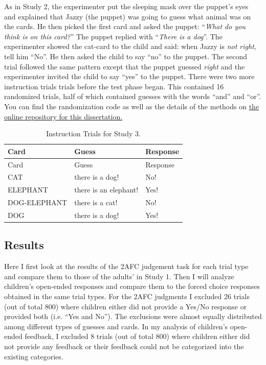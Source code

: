 \documentclass[oneside]{report}
\theoremstyle{definition}
\theoremstyle{definition}
\theoremstyle{definition}
\theoremstyle{remark}
\begin{document}
As in Study 2, the experimenter put the sleeping mask over the puppet's
eyes and explained that Jazzy (the puppet) was going to guess what
animal was on the cards. He then picked the first card and asked the
puppet: ``\emph{What do you think is on this card?}'' The puppet replied
with ``\emph{There is a dog}''. The experimenter showed the cat-card to
the child and said: when Jazzy is \emph{not right}, tell him ``No''. He
then asked the child to say ``no'' to the puppet. The second trial
followed the same pattern except that the puppet guessed \emph{right}
and the experimenter invited the child to say ``yes'' to the puppet.
There were two more instruction trials trials before the test phase
began. This contained 16 randomized trials, half of which contained
guesses with the words ``and'' and ``or''. You can find the
randomization code as well as the details of the methods on
\href{https://github.com/jasbi/jasbi_dissertation_LearningDisjunction/blob/master/connective_comprehension/study3/0_methods/children}{the
online repository for this dissertation.}
\begin{longtable}[]{@{}lll@{}}
\caption{\label{tab:instructionStudy3} Instruction Trials for Study
3.}\tabularnewline
\toprule
Card & Guess & Response\tabularnewline
\midrule
\endfirsthead
\toprule
Card & Guess & Response\tabularnewline
\midrule
\endhead
CAT & there is a dog! & No!\tabularnewline
ELEPHANT & there is an elephant! & Yes!\tabularnewline
DOG-ELEPHANT & there is a cat! & No!\tabularnewline
DOG & there is a dog! & Yes!\tabularnewline
\bottomrule
\end{longtable}
\subsection{Results}\label{results-4}

Here I first look at the results of the 2AFC judgement task for each
trial type and compare them to those of the adults' in Study 1. Then I
will analyze children's open-ended responses and compare them to the
forced choice responses obtained in the same trial types. For the 2AFC
judgments I excluded 26 trials (out of total 800) where children either
did not provide a Yes/No response or provided both (i.e. ``Yes and
No''). The exclusions were almost equally distributed among different
types of guesses and cards. In my analysis of children's open-ended
feedback, I excluded 8 trials (out of total 800) where children either
did not provide any feedback or their feedback could not be categorized
into the existing categories.
\end{document}
